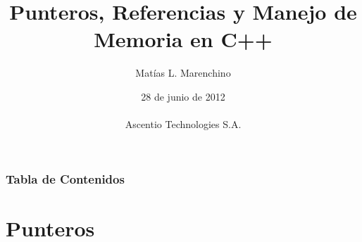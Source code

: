 \documentclass[xcolor=table,spanish,9pt]{beamer}
\title[Punteros, Referencias y Manejo de Memoria en C++]{Punteros, Referencias y Manejo de Memoria en C++}   %
\author[Mat\'ias L. Marenchino] %
{Mat\'ias L. Marenchino}%
\date %
{28 de junio de 2012 \\ \mbox{} \\ Ascentio Technologies S.A.}
\begin{document}
\begin{frame}
  \titlepage
\end{frame}

\begin{frame}[allowframebreaks]
  \frametitle{Tabla de Contenidos}
  \tableofcontents
\end{frame}




\section{Punteros}
\end{document}
